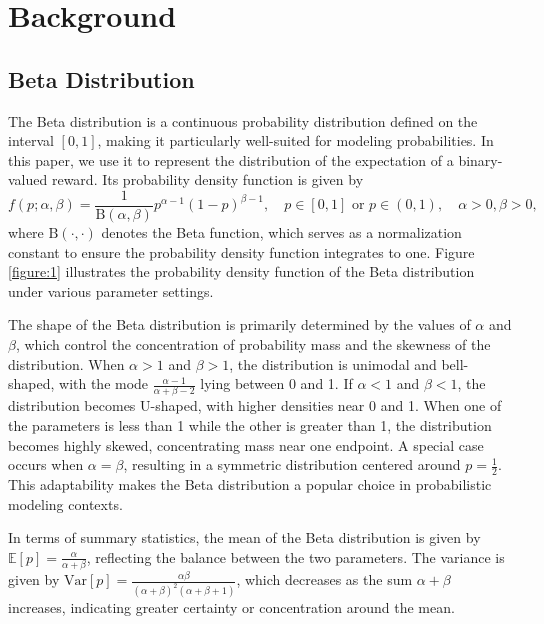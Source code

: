 \documentclass{article}
\theoremstyle{plain}
\theoremstyle{definition}
\theoremstyle{remark}
\begin{document}
\section{Background}

\subsection{Beta Distribution}
\label{section:2.1}
The Beta distribution is a continuous probability distribution defined on the interval $[0,1]$, making it particularly well-suited for modeling probabilities. In this paper, we use it to represent the distribution of the expectation of a binary-valued reward. Its probability density function is given by
\begin{equation} 
\label{equation:1}
f(p; \alpha, \beta) = \frac{1}{\mathrm{B}(\alpha,\beta)} p^{\alpha - 1} (1 - p)^{\beta - 1}, \quad p \in [0,1] \text{ or } p \in (0,1), \quad \alpha > 0, \beta > 0,
\end{equation}
where $\mathrm{B}(\cdot,\cdot)$ denotes the Beta function, which serves as a normalization constant to ensure the probability density function integrates to one. Figure \ref{figure:1} illustrates the probability density function of the Beta distribution under various parameter settings.

The shape of the Beta distribution is primarily determined by the values of $\alpha$ and $\beta$, which control the concentration of probability mass and the skewness of the distribution. When $\alpha>1$ and $\beta>1$, the distribution is unimodal and bell-shaped, with the mode $\frac{\alpha-1}{\alpha+\beta-2}$ lying between 0 and 1. If $\alpha<1$ and $\beta<1$, the distribution becomes U-shaped, with higher densities near 0 and 1. When one of the parameters is less than 1 while the other is greater than 1, the distribution becomes highly skewed, concentrating mass near one endpoint. A special case occurs when $\alpha=\beta$, resulting in a symmetric distribution centered around $p=\frac{1}{2}$. This adaptability makes the Beta distribution a popular choice in probabilistic modeling contexts.

In terms of summary statistics, the mean of the Beta distribution is given by $\mathbb{E}[p]=\frac{\alpha}{\alpha+\beta}$, reflecting the balance between the two parameters. The variance is given by $\mathrm{Var}[p]=\frac{\alpha\beta}{(\alpha+\beta)^2(\alpha+\beta+1)}$, which decreases as the sum $\alpha+\beta$ increases, indicating greater certainty or concentration around the mean. 
\end{document}
